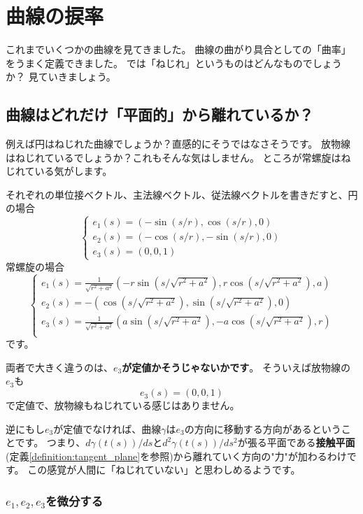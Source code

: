 \chapter{曲線の捩率}

これまでいくつかの曲線を見てきました。
曲線の曲がり具合としての「曲率」をうまく定義できました。
では「ねじれ」というものはどんなものでしょうか？
見ていきましょう。



\section{曲線はどれだけ「平面的」から離れているか？}

例えば円はねじれた曲線でしょうか？直感的にそうではなさそうです。
放物線はねじれているでしょうか？これもそんな気はしません。
ところが常螺旋はねじれている気がします。

それぞれの単位接ベクトル、主法線ベクトル、従法線ベクトルを書きだすと、円の場合
\[
  \begin{cases}
    e_1(s)=(-\sin(s/r),\cos(s/r),0)\\
    e_2(s)=(-\cos(s/r),-\sin(s/r),0)\\
    e_3(s)=(0,0,1)
  \end{cases}
\]
常螺旋の場合
\[
  \begin{cases}
    e_1(s)=\frac{1}{\sqrt{r^2+a^2}}(-r\sin(s/\sqrt{r^2+a^2}),r\cos(s/\sqrt{r^2+a^2}),a)\\
    e_2(s)=-(\cos(s/\sqrt{r^2+a^2}),\sin(s/\sqrt{r^2+a^2}),0)\\
    e_3(s)=\frac{1}{\sqrt{r^2+a^2}}(a\sin(s/\sqrt{r^2+a^2}),-a\cos(s/\sqrt{r^2+a^2}),r)\\
  \end{cases}
\]
です。

両者で大きく違うのは、\textbf{$e_3$が定値かそうじゃないかです}。
そういえば放物線の$e_3$も
\[
  e_3(s)=(0,0,1)
\]
で定値で、放物線もねじれている感じはありません。

逆にもし$e_3$が定値でなければ、曲線$\gamma$は$e_3$の方向に移動する方向があるということです。
つまり、$d\gamma(t(s))/ds$と$d^2\gamma(t(s))/ds^2$が張る平面である\textbf{接触平面}(定義\ref{definition:tangent_plane}を参照)から離れていく方向の"力"が加わるわけです。
この感覚が人間に「ねじれていない」と思わしめるようです。

\subsection{$e_1,e_2,e_3$を微分する}\label{subsection:differential-of-frames}

